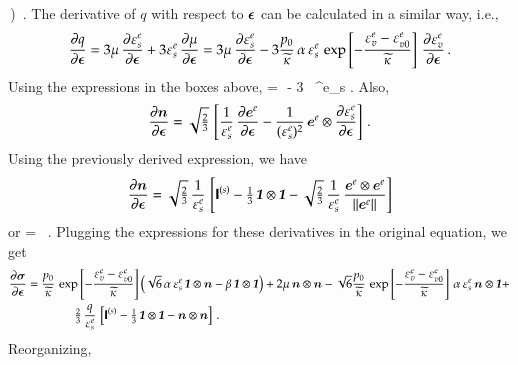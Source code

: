 \documentclass[twoside,10pt,a4paper]{article}
\begin{document}
            \beta\,\Bone \right) \,.
\Eeq
The derivative of $q$ with respect to $\Beps$ can be calculated in a similar way, i.e.,
\[
  \Partial{q}{\Beps} = 3\mu\,\Partial{\Ve^e_s}{\Beps} + 3\Ve^e_s\,\Partial{\mu}{\Beps}
   = 3\mu\,\Partial{\Ve^e_s}{\Beps} - 3\frac{p_0}{\kappatilde}\,\alpha\,\Ve^e_s\,
      \exp\left[-\frac{\Ve^e_v - \Ve^e_{v0}}{\kappatilde}\right]\,\Partial{\Ve^e_v}{\Beps} \,.
\]
Using the expressions in the boxes above, 
\Beq
   = \,\mu\,\BnT - 3\,
      \exp{}\,\alpha\,\Ve^e_s\,\Bone \,.
\Eeq
Also,
\[
   \Partial{\BnT}{\Beps} = \sqrt{\tfrac{2}{3}}\,\left[\frac{1}{\Ve^e_s}\,\Partial{\BeT^e}{\Beps}
     - \frac{1}{(\Ve^e_s)^2}\,\BeT^e\otimes\Partial{\Ve^e_s}{\Beps}\right] \,.
\]
Using the previously derived expression, we have
\[
   \Partial{\BnT}{\Beps} = \sqrt{\tfrac{2}{3}}\,\frac{1}{\Ve^e_s}\,\left[
        \SfI^{(s)} - \tfrac{1}{3}\,\Bone\otimes\Bone
     - \sqrt{\tfrac{2}{3}}\,\frac{1}{\Ve^e_s}\,\frac{\BeT^e\otimes\BeT^e}{\Norm{\BeT^e}{}}\right] 
\]
or
\Beq
   \Partial{\BnT}{\Beps} = \,\, \,.
\Eeq
Plugging the expressions for these derivatives in the original equation, we get
\[
  \Bal
   \Partial{\Bsig}{\Beps} & = \frac{p_0}{\kappatilde}\,
      \exp\left[-\frac{\Ve^e_v - \Ve^e_{v0}}{\kappatilde}\right]
      \left(\sqrt{6}\,\alpha\,\Ve^e_s\,\Bone\otimes\BnT - \beta\,\Bone\otimes\Bone \right) + 
      2\mu\,\BnT\otimes\BnT - \sqrt{6}\frac{p_0}{\kappatilde}\,
      \exp\left[-\frac{\Ve^e_v - \Ve^e_{v0}}{\kappatilde}\right]\,\alpha\,\Ve^e_s\,\BnT\otimes\Bone +\\
      & \qquad \qquad \tfrac{2}{3}\,\frac{q}{\Ve^e_s}\,\left[
        \SfI^{(s)} - \tfrac{1}{3}\,\Bone\otimes\Bone - \BnT\otimes\BnT\right] \,.
  \Eal
\]
Reorganizing,
\Beq
\Eeq
\end{document}
